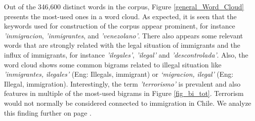         Out of the 346,600 distinct words in the corpus, Figure \ref{general_Word_Cloud} presents the most-used ones in a word cloud. As expected, it is seen that the keywords used for construction of the corpus appear prominent, for instance {\it 'inmigracion}, {\it 'inmigrantes}, and {\it 'venezolano'}. There also appears some relevant words that are strongly related with the legal situation of immigrants and the influx of immigrants, for instance {\it 'ilegales'}, {\it 'ilegal'} and {\it 'descontrolada'}. Also, the word cloud shows some common bigrams related to illegal situation like {\it 'inmigrantes, ilegales'} (Eng: Illegals, immigrant) or  {\it ‘migracion,  ilegal'} (Eng: Illegal, immigration). Interestingly, the term {\it 'terrorismo'} is prevalent and also features in multiple of the most-used bigrams in Figure \ref{fig_bi_tot}. Terrorism would not normally be considered connected to immigration in Chile. We analyze this finding further on page \pageref{par_res_terr}.
        
